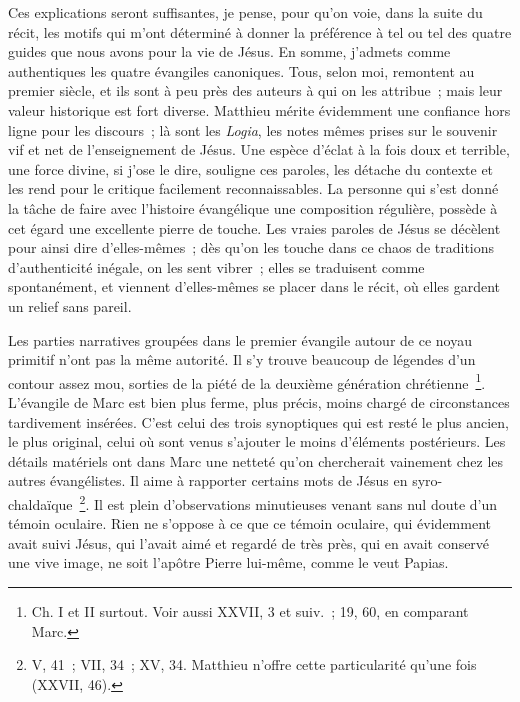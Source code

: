 \documentclass[french,twoside]{book} %
\begin{document}
Ces explications seront suffisantes, je pense, pour qu’on voie, dans la suite du récit, les motifs qui m’ont déterminé à donner la préférence à tel ou tel des quatre guides que nous avons pour la vie de Jésus. En somme, j’admets comme authentiques les quatre évangiles canoniques. Tous, selon moi, remontent au premier siècle, et ils sont à peu près des auteurs à qui on les attribue ; mais leur valeur historique est fort diverse. Matthieu mérite évidemment une confiance hors ligne pour les discours ; là sont les {\itshape Logia}, les notes mêmes prises sur le souvenir vif et net de l’enseignement de Jésus. Une espèce d’éclat à la fois doux et terrible, une force divine, si j’ose le dire, souligne ces paroles, les détache du contexte et les rend pour le critique facilement reconnaissables. La personne qui s’est donné la tâche de faire avec l’histoire évangélique une composition régulière, possède à cet égard une excellente pierre de touche. Les vraies paroles de Jésus se décèlent pour ainsi dire d’elles-mêmes ; dès qu’on les touche dans ce chaos de traditions d’authenticité inégale, on les sent vibrer ; elles se traduisent comme spontanément, et viennent d’elles-mêmes se placer dans le récit, où elles gardent un relief sans pareil.\par
Les parties narratives groupées dans le premier évangile autour de ce noyau primitif n’ont pas la même autorité. Il s’y trouve beaucoup de légendes d’un contour assez mou, sorties de la piété de la deuxième génération chrétienne \footnote{Ch. I et II surtout. Voir aussi XXVII, 3 et suiv. ; 19, 60, en comparant Marc.}. L’évangile de Marc est bien plus ferme, plus précis, moins chargé de circonstances tardivement insérées. C’est celui des trois synoptiques qui est resté le plus ancien, le plus original, celui où sont venus s’ajouter le moins d’éléments postérieurs. Les détails matériels ont dans Marc une netteté qu’on chercherait vainement chez les autres évangélistes. Il aime à rapporter certains mots de Jésus en syro-chaldaïque \footnote{V, 41 ; VII, 34 ; XV, 34. Matthieu n’offre cette particularité qu’une fois (XXVII, 46).}. Il est plein d’observations minutieuses venant sans nul doute d’un témoin oculaire. Rien ne s’oppose à ce que ce témoin oculaire, qui évidemment avait suivi Jésus, qui l’avait aimé et regardé de très près, qui en avait conservé une vive image, ne soit l’apôtre Pierre lui-même, comme le veut Papias.\par
\end{document}
